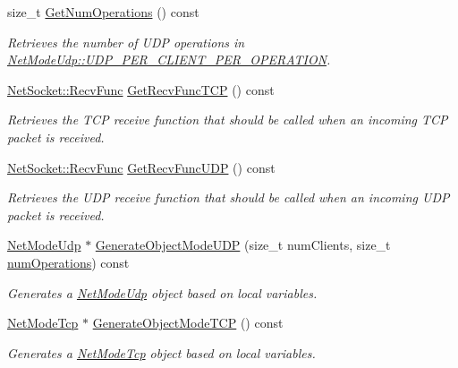 \begin{DoxyCompactItemize}
size\_\-t \hyperlink{class_net_instance_profile_ae4d9e03d9700d57b01921027459c477f}{GetNumOperations} () const 
\begin{DoxyCompactList}\small\item\em Retrieves the number of UDP operations in \hyperlink{class_net_mode_a43cfa55ee6a4db66a8d7d6c27f766964a947fd0828716fc0442ea546cce111c27}{NetModeUdp::UDP\_\-PER\_\-CLIENT\_\-PER\_\-OPERATION}. \item\end{DoxyCompactList}\item 
\hyperlink{class_net_socket_a52b5f4de8d0a47fd8620f542b21c076c}{NetSocket::RecvFunc} \hyperlink{class_net_instance_profile_af498bede8c8e0029db0f26c3ef796dc0}{GetRecvFuncTCP} () const 
\begin{DoxyCompactList}\small\item\em Retrieves the TCP receive function that should be called when an incoming TCP packet is received. \item\end{DoxyCompactList}\item 
\hyperlink{class_net_socket_a52b5f4de8d0a47fd8620f542b21c076c}{NetSocket::RecvFunc} \hyperlink{class_net_instance_profile_a63584bbc071271a73cc422e7e075b518}{GetRecvFuncUDP} () const 
\begin{DoxyCompactList}\small\item\em Retrieves the UDP receive function that should be called when an incoming UDP packet is received. \item\end{DoxyCompactList}\item 
\hyperlink{class_net_mode_udp}{NetModeUdp} $\ast$ \hyperlink{class_net_instance_profile_ae6ad441d78eb208534e1321521345f93}{GenerateObjectModeUDP} (size\_\-t numClients, size\_\-t \hyperlink{class_net_instance_profile_acfc20340749f35543345f8b6c00fef4a}{numOperations}) const 
\begin{DoxyCompactList}\small\item\em Generates a \hyperlink{class_net_mode_udp}{NetModeUdp} object based on local variables. \item\end{DoxyCompactList}\item 
\hyperlink{class_net_mode_tcp}{NetModeTcp} $\ast$ \hyperlink{class_net_instance_profile_a51acbcfcbd4920688fa4ac69dc654d99}{GenerateObjectModeTCP} () const 
\begin{DoxyCompactList}\small\item\em Generates a \hyperlink{class_net_mode_tcp}{NetModeTcp} object based on local variables. \item\end{DoxyCompactList}\item 

\end{DoxyCompactItemize}

